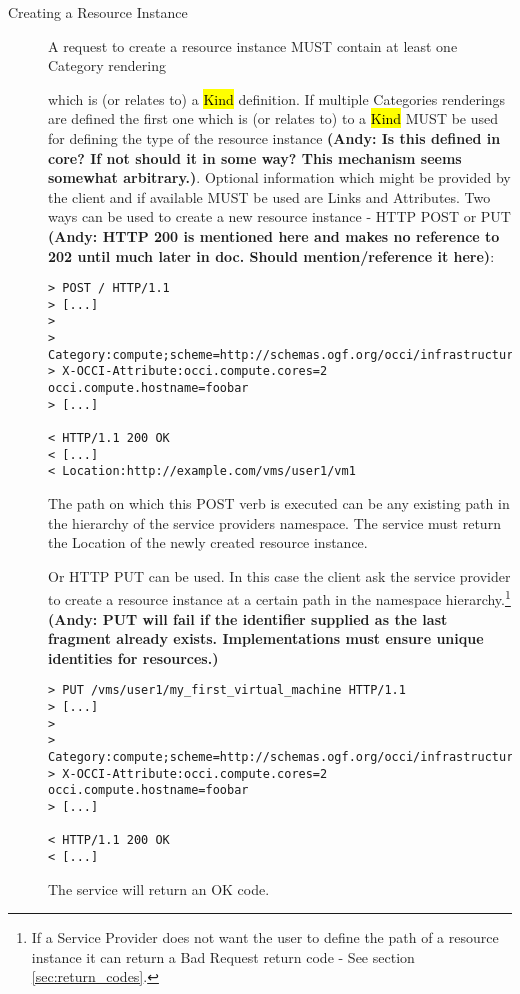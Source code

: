 \documentclass[10pt,a4paper]{article}
\begin{document}
\begin{description}
\item[Creating a Resource Instance] A request to create a resource
  instance MUST contain at least one Category rendering

  which is (or relates to) a \hl{Kind} definition. If multiple
  Categories renderings are defined the first one which is (or relates
  to) to a \hl{Kind} MUST be used for defining the type of the
  resource instance \textbf{(Andy: Is this defined in core?  If not
    should it in some way? This mechanism seems somewhat
    arbitrary.)}. Optional information which might be provided by the
  client and if available MUST be used are Links and Attributes. Two
  ways can be used to create a new resource instance - HTTP POST or
  PUT \textbf{(Andy: HTTP 200 is mentioned here and makes no reference
    to 202 until much later in doc. Should mention/reference it
    here)}:
\begin{verbatim}
> POST / HTTP/1.1
> [...]
> 
> Category:compute;scheme=http://schemas.ogf.org/occi/infrastructure
> X-OCCI-Attribute:occi.compute.cores=2 occi.compute.hostname=foobar
> [...]
 
< HTTP/1.1 200 OK
< [...]
< Location:http://example.com/vms/user1/vm1
\end{verbatim}
  The path on which this POST verb is executed can be any existing
  path in the hierarchy of the service providers namespace. The
  service must return the Location of the newly created resource
  instance.

  Or HTTP PUT can be used. In this case the client ask the service
  provider to create a resource instance at a certain path in the
  namespace hierarchy.\footnote{If a Service Provider does not want the
    user to define the path of a resource instance it can return a Bad
    Request return code - See section \ref{sec:return_codes}.} \textbf{(Andy: PUT will fail if the 
    identifier supplied as the last fragment already exists. Implementations must ensure unique 
    identities for resources.)}
\begin{verbatim}
> PUT /vms/user1/my_first_virtual_machine HTTP/1.1
> [...]
> 
> Category:compute;scheme=http://schemas.ogf.org/occi/infrastructure
> X-OCCI-Attribute:occi.compute.cores=2 occi.compute.hostname=foobar
> [...]
 
< HTTP/1.1 200 OK
< [...]
\end{verbatim}
  The service will return an OK code.


\end{description}
\end{document}
